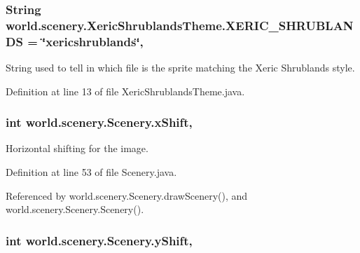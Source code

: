 \hypertarget{interfaceworld_1_1scenery_1_1_xeric_shrublands_theme_a03cab029cbad9fdfa722122d3393c06c}{
\subsubsection[{X\-E\-R\-I\-C\-\_\-\-S\-H\-R\-U\-B\-L\-A\-N\-D\-S}]{\setlength{\rightskip}{0pt plus 5cm}String world.\-scenery.\-Xeric\-Shrublands\-Theme.\-X\-E\-R\-I\-C\-\_\-\-S\-H\-R\-U\-B\-L\-A\-N\-D\-S = \char`\"{}xericshrublands\char`\"{}\hspace{0.3cm}{\ttfamily [static]}, {\ttfamily [inherited]}}}\label{interfaceworld_1_1scenery_1_1_xeric_shrublands_theme_a03cab029cbad9fdfa722122d3393c06c}


String used to tell in which file is the sprite matching the Xeric Shrublands style. 



Definition at line 13 of file Xeric\-Shrublands\-Theme.\-java.

\hypertarget{classworld_1_1scenery_1_1_scenery_a0999f105f7630fd67fd9d440da6983aa}{
\subsubsection[{x\-Shift}]{\setlength{\rightskip}{0pt plus 5cm}int world.\-scenery.\-Scenery.\-x\-Shift\hspace{0.3cm}{\ttfamily [protected]}, {\ttfamily [inherited]}}}\label{classworld_1_1scenery_1_1_scenery_a0999f105f7630fd67fd9d440da6983aa}


Horizontal shifting for the image. 



Definition at line 53 of file Scenery.\-java.



Referenced by world.\-scenery.\-Scenery.\-draw\-Scenery(), and world.\-scenery.\-Scenery.\-Scenery().

\hypertarget{classworld_1_1scenery_1_1_scenery_ac9ca2c17cf6920deffe490c013b0e638}{
\subsubsection[{y\-Shift}]{\setlength{\rightskip}{0pt plus 5cm}int world.\-scenery.\-Scenery.\-y\-Shift\hspace{0.3cm}{\ttfamily [protected]}, {\ttfamily [inherited]}}}\label{classworld_1_1scenery_1_1_scenery_ac9ca2c17cf6920deffe490c013b0e638}


